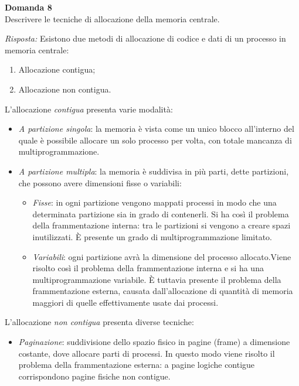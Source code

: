\documentclass{article}
\newenvironment{problem}[2][Domanda]
    { \begin{mdframed}[backgroundcolor=gray!20] \textbf{#1 #2} \\}
    {  \end{mdframed}}
\newenvironment{solution}
    {\textit{Risposta:}}
    {}
\begin{document}
\begin{problem}{8}
Descrivere le tecniche di allocazione della memoria centrale.
\end{problem}
\begin{solution}
Esistono due metodi di allocazione di codice e dati di un processo in memoria centrale:
\begin{enumerate}
    \item Allocazione contigua;
    \item Allocazione non contigua.
\end{enumerate} 
L’allocazione \textit{contigua} presenta varie modalità:
\begin{itemize}
    \item \emph{A partizione singola}: la memoria è vista come un unico blocco all’interno del quale è possibile allocare un solo processo per volta, con totale mancanza di multiprogrammazione.
    \item \emph{A partizione multipla}: la memoria è suddivisa in più parti, dette partizioni, che possono avere dimensioni fisse o variabili:
    \begin{itemize}
        \item \emph{Fisse}: in ogni partizione vengono mappati processi in modo che una determinata partizione sia in grado di contenerli.
        \newline Si ha così il problema della frammentazione interna: tra le partizioni si vengono a creare spazi inutilizzati.
        \newline
        È presente un grado di multiprogrammazione limitato.
        \item \emph{Variabili}: ogni partizione avrà la dimensione del processo allocato.\newline Viene risolto così il problema della frammentazione interna e si ha una multiprogrammazione variabile.
        \newline È tuttavia presente il problema della frammentazione esterna, causata dall’allocazione di quantità di memoria maggiori di quelle effettivamente usate dai processi.
    \end{itemize}
\end{itemize}
L’allocazione \textit{non contigua} presenta diverse tecniche:
\begin{itemize}
    \item \emph{Paginazione}: suddivisione dello spazio fisico in pagine (frame) a dimensione costante, dove allocare parti di processi.
    \newline In questo modo viene risolto il problema della frammentazione esterna: a pagine logiche contigue corrispondono pagine fisiche non contigue.

\end{itemize}
\end{solution}
\end{document}
